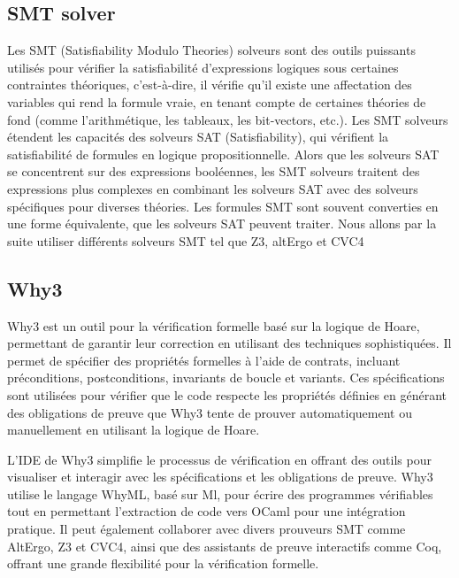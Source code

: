 \documentclass[11pt]{article}
\begin{document}
\subsection{SMT solver}
\label{sec:org2e9cf86}

Les SMT (Satisfiability Modulo Theories) solveurs sont des outils puissants utilisés pour 
vérifier la satisfiabilité d'expressions logiques sous certaines contraintes théoriques, 
c'est-à-dire, il vérifie qu'il existe une affectation des variables qui rend la formule vraie, 
en tenant compte de certaines théories de fond (comme l'arithmétique, les tableaux, les bit-vectors, etc.).
Les SMT solveurs étendent les capacités des solveurs SAT (Satisfiability), 
qui vérifient la satisfiabilité de formules en logique propositionnelle. 
Alors que les solveurs SAT se concentrent sur des expressions booléennes, 
les SMT solveurs traitent des expressions plus complexes en combinant les solveurs SAT avec des solveurs spécifiques pour diverses théories.
Les formules SMT sont souvent converties en une forme équivalente, que les solveurs SAT peuvent traiter.
Nous allons par la suite utiliser différents solveurs SMT tel que Z3, altErgo et CVC4

\subsection{Why3}
\label{sec:org8c65aee}

Why3 est un outil pour la vérification formelle basé sur la logique de Hoare, 
permettant de garantir leur correction en utilisant des techniques sophistiquées. 
Il permet de spécifier des propriétés formelles à l'aide de contrats, incluant préconditions, postconditions, 
invariants de boucle et variants. 
Ces spécifications sont utilisées pour vérifier que le code respecte les propriétés définies en générant des obligations de preuve que Why3
tente de prouver automatiquement ou manuellement en utilisant la logique de Hoare.

L'IDE de Why3 simplifie le processus de vérification en offrant des outils 
pour visualiser et interagir avec les spécifications et les obligations de preuve. 
Why3 utilise le langage WhyML, basé sur Ml, pour écrire des programmes vérifiables tout en permettant 
l'extraction de code vers OCaml pour une intégration pratique. 
Il peut également collaborer avec divers prouveurs SMT comme AltErgo, Z3 et CVC4, 
ainsi que des assistants de preuve interactifs comme Coq, 
offrant une grande flexibilité pour la vérification formelle.
\end{document}
